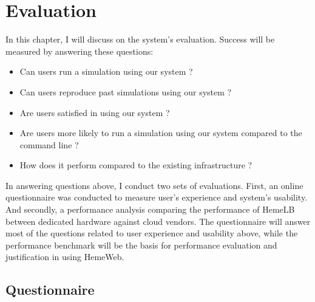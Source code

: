  

\chapter[Evaluation]{Evaluation}
In this chapter, I will discuss on the system's evaluation. Success will be measured by answering these questions:

\begin{itemize}
    \item Can users run a simulation using our system ?
    \item Can users reproduce past simulations using our system ?
    \item Are users satisfied in using our system ?
    \item Are users more likely to run a simulation using our system compared to the command line ?
    \item How does it perform compared to the existing infrastructure ?
\end{itemize}


In answering questions above, I conduct two sets of evaluations. First, an online questionnaire was conducted to measure user's experience and system's usability. And secondly, a performance analysis comparing the performance of HemeLB between dedicated hardware against cloud vendors. The questionnaire will answer most of the questions related to user experience and usability above, while the performance benchmark will be the basis for performance evaluation and justification in using HemeWeb.


\section{Questionnaire}

